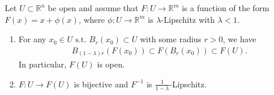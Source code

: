 \begin{lemma}\label{lem:lipschitz-perturb}
	Let $U \subset \mathbb{R}^{n}$ be open and assume that $F: U \to \mathbb{R}^{m}$ is a function of the form $F(x) = x + \phi(x)$, where $\phi: U \to \mathbb{R}^{m}$ is $\lambda$-Lipschitz with $\lambda < 1$.
	\begin{enumerate}
		\item For any $x_{0} \in U \text{ s.t. } B_{r}(x_{0}) \subset U$ with some radius $r > 0$, we have
		      \begin{align*}
			      B_{(1-\lambda)r}(F(x_{0})) \subset F(B_{r}(x_{0})) \subset F(U).
		      \end{align*}
		      In particular, $F(U)$ is open.
		\item $F: U \to F(U)$ is bijective and $F^{-1}$ is $\frac{1}{1-\lambda}$-Lipschitz.
	\end{enumerate}
\end{lemma}
